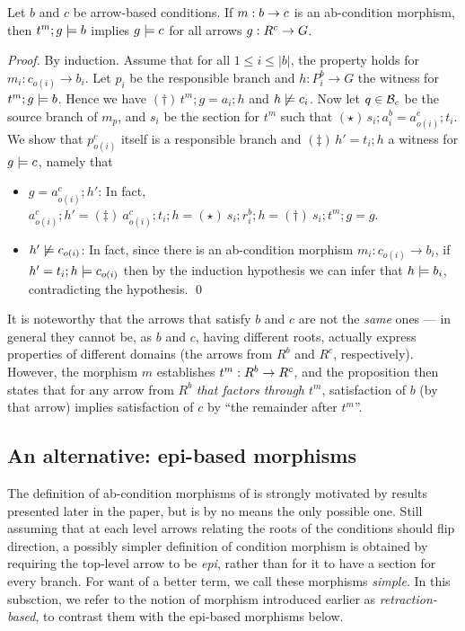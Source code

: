 \begin{proposition}
Let $b$ and $c$  be arrow-based conditions. If $m:b\rightarrow c$ is an ab-condition morphism, then $t^m;g\models b$ implies $g \models c$ for all arrows $g:R^c\rightarrow G$.
\end{proposition}
%
\emph{Proof.} By induction. Assume that for all $1\leq i\leq |b|$, the property holds for $m_i:c_{o(i)} \to b_i$. Let $p_i$ be the responsible branch and $h: P^b_i \to G$ the witness for $t^m;g\models b$. 
Hence we have $(\dagger)\, t^m; g=a_i;h$ and $h \not\models c_i$.  Now let $q \in \mathcal{B}_c$ be the source branch of $m_{p}$, and $s_i$ be the section for $t^m$ such that $(\star)\, s_i;a^b_i = a^c_{o(i)}; t_i$. 
We show that $p^c_{o(i)}$ itself is a responsible branch and $(\ddagger)\, h'=t_i;h$ a witness for $g\models c$, namely that 
\begin{itemize}
\item $g = a^c_{o(i)};h'$: In fact, $a^c_{o(i)};h' =\!(\ddagger)\ a^c_{o(i)};t_i;h =\!(\star)\ s_i;r^b_i; h  =\!(\dagger)\ s_i;t^m;g = g$. 
\item $h' \not\models c_{o(i)}$: In fact, since there is an ab-condition morphism $m_i: c_{o(i)} \to b_i$, if $h'= t_i;h \models c_{o(i)}$ then by the induction hypothesis we can infer that $h \models b_i$, contradicting the hypothesis. \qed
\end{itemize}

It is noteworthy that the arrows that satisfy $b$ and $c$ are not the \emph{same} ones --- in general they cannot be, as $b$ and $c$, having different roots, actually express properties of different domains (the arrows from $R^b$ and $R^c$, respectively). However, the morphism $m$ establishes $t^m:R^b\rightarrow R^c$, and the proposition then states that for any arrow from $R^b$ \emph{that factors through $t^m$}, satisfaction of $b$ (by that arrow) implies satisfaction of $c$ by ``the remainder after $t^m$''.


\subsection{An alternative: epi-based morphisms}

The definition of ab-condition morphisms of  is strongly motivated by results presented later in the paper, but is by no means the only possible one. Still assuming that at each level arrows relating the roots of the conditions should flip direction, a possibly simpler definition of condition morphism is obtained by requiring the top-level arrow to be \emph{epi}, rather than for it to have a section for every branch. For want of a better term, we call these morphisms \emph{simple}. In this subsction, we refer to the notion of morphism introduced earlier as \emph{retraction-based}, to contrast them with the epi-based morphisms below.

